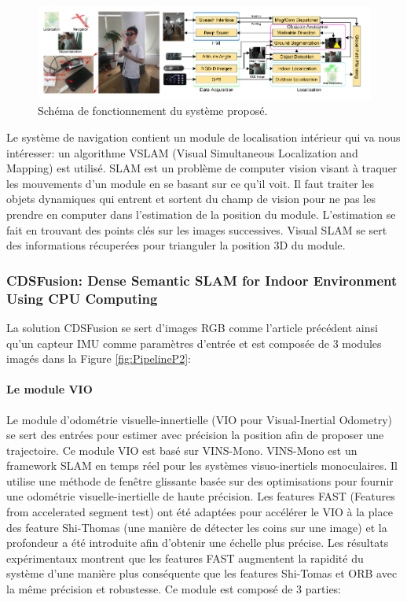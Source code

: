 \documentclass[11pt]{article}
\begin{document}
  \begin{figure}[hbt]  
    \includegraphics[width=\textwidth]{PipelineP1.png}    
    \caption{Schéma de fonctionnement du système proposé.}
    \label{fig:PipelineP1}
  \end{figure} 

  Le système de navigation contient un module de localisation intérieur qui va nous intéresser: un algorithme VSLAM (Visual Simultaneous 
  Localization and Mapping) est utilisé. SLAM est un problème de computer vision visant à traquer les mouvements d'un module en se basant
  sur ce qu'il voit. Il faut traiter les objets dynamiques qui entrent et sortent du champ de vision pour ne pas les prendre en computer
  dans l'estimation de la position du module. L'estimation se fait en trouvant des points clés sur les images successives.  Visual SLAM
  se sert des informations récuperées pour trianguler la position 3D du module. 
  
  \pagebreak

  \subsubsection{CDSFusion: Dense Semantic SLAM for Indoor Environment Using CPU
  Computing}  

  La solution CDSFusion \cite{wangCDSFusionDenseSemantic2022} se sert d'images RGB comme l'article précédent ainsi qu'un capteur IMU comme paramètres d'entrée et est composée de 
  3 modules imagés dans la Figure \ref{fig:PipelineP2}:

  \paragraph{Le module VIO}
  Le module d'odométrie visuelle-innertielle (VIO pour Visual-Inertial Odometry) se sert des entrées pour estimer avec précision la position 
  afin de proposer une trajectoire. Ce module VIO est basé sur VINS-Mono. VINS-Mono est un framework SLAM en temps réel pour les 
  systèmes visuo-inertiels monoculaires. Il utilise une méthode de fenêtre glissante basée sur des optimisations pour fournir une odométrie 
  visuelle-inertielle de haute précision.
  Les features FAST (Features from accelerated segment test) ont été adaptées pour accélérer le VIO à 
  la place des feature Shi-Thomas (une manière de détecter les coins sur une image) et la profondeur a été introduite afin d'obtenir une échelle 
  plus précise. Les résultats expérimentaux montrent que les features FAST augmentent la rapidité du système d'une manière plus conséquente 
  que les features Shi-Tomas et ORB avec la même précision et robustesse. Ce module est composé de 3 parties:
\end{document}
